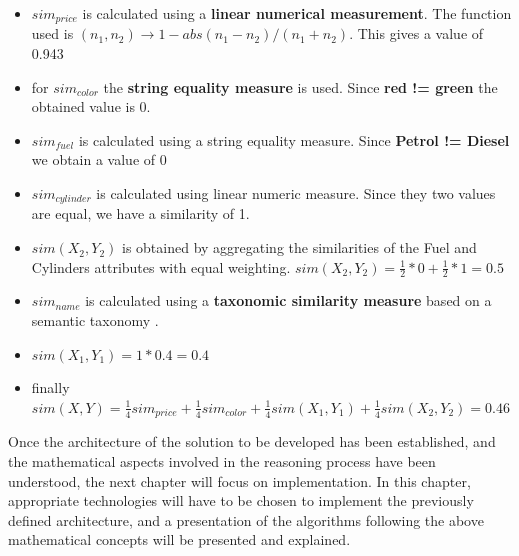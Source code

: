     \begin{itemize}
        \item $sim_{price}$ is calculated using a \textbf{linear numerical measurement}. The function used is $(n_1, n_2) \rightarrow 1 - abs(n_1 - n_2) / (n_1 + n_2)$. This gives a value of 0.943
        \item for $sim_{color}$ the \textbf{string equality measure} is used. Since \textbf{red != green} the obtained value is 0.
        \item $sim_{fuel}$ is calculated using a string equality measure. Since \textbf{Petrol != Diesel} we obtain a value of 0
        \item $sim_{cylinder}$ is calculated using linear numeric measure. Since they two values are equal, we have a similarity of 1.
        \item $sim(X_2, Y_2)$ is obtained by aggregating the similarities of the Fuel and Cylinders attributes with equal weighting. $sim(X_2, Y_2) = \frac{1}{2} * 0 + \frac{1}{2} * 1 = 0.5$
        \item $sim_{name}$ is calculated using a \textbf{taxonomic similarity measure} based on a semantic taxonomy \cite{malburg2021improving}.
        \item $sim(X_1, Y_1) = 1 * 0.4 = 0.4$
        \item finally $sim(X, Y) = \frac{1}{4} sim_{price} + \frac{1}{4} sim_{color} + \frac{1}{4} sim(X_1, Y_1) + \frac{1}{4} sim(X_2, Y_2) = 0.46$ \\
    \end{itemize}

Once the architecture of the solution to be developed has been established, and the mathematical aspects involved in the reasoning process have been understood, the next chapter will focus on implementation. In this chapter, appropriate technologies will have to be chosen to implement the previously defined architecture, and a presentation of the algorithms following the above mathematical concepts will be presented and explained.\\